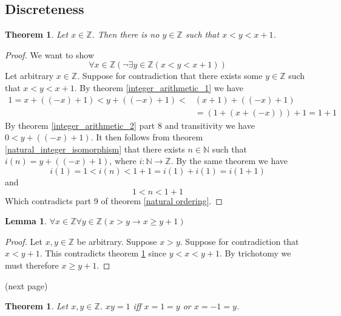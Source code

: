 \documentclass{report}
\newtheorem{theorem}[theo]{Theorem}
\newtheorem{lemma}[theo]{Lemma}
\begin{document}
\subsection{Discreteness}
\begin{theorem}\label{integer_discreteness}
Let $x\in\mathbb Z$. Then there is no $y\in\mathbb Z$ such that $x<y<x+1$.
\end{theorem}
\begin{proof}
We want to show
\begin{equation*}
\forall x\in\mathbb Z(\neg\exists y\in\mathbb Z(x<y<x+1))
\end{equation*}
Let arbitrary $x\in\mathbb Z$. Suppose for contradiction that there exists some $y\in\mathbb Z$ such that $x<y<x+1$.
By theorem \ref{integer_arithmetic_1} we have
\begin{align*}
1=x+((-x)+1)<y+((-x)+1)<&(x+1)+((-x)+1)\\
&=(1+(x+(-x)))+1=1+1
\end{align*}
By theorem \ref{integer_arithmetic_2} part 8 and transitivity we have $0<y+((-x)+1)$. It then follows from theorem
\ref{natural_integer_isomorphism} that there exists $n\in\mathbb N$ such that $i(n)=y+((-x)+1)$, where $i:\mathbb N\to\mathbb Z$. 
By the same theorem we have
\begin{equation*}
i(1)=1<i(n)<1+1=i(1)+i(1)=i(1+1)
\end{equation*}
and
\begin{equation*}
1<n<1+1
\end{equation*}
Which contradicts part 9 of theorem \ref{natural ordering}.
\end{proof}
\begin{lemma}
$\forall x\in\mathbb Z\forall y\in\mathbb Z(x>y\to x\geq y+1)$
\end{lemma}
\begin{proof}
Let $x,y\in\mathbb Z$ be arbitrary. Suppose $x>y$. Suppose for contradiction that $x<y+1$. 
This contradicts theorem \ref{integer_discreteness} since $y<x<y+1$. By trichotomy we must therefore $x\geq y+1$.
\end{proof}
\noindent(next page)\newpage
\begin{theorem}
Let $x,y\in\mathbb Z$. $xy=1$ iff $x=1=y$ or $x=-1=y$.
\end{theorem}
\end{document}
